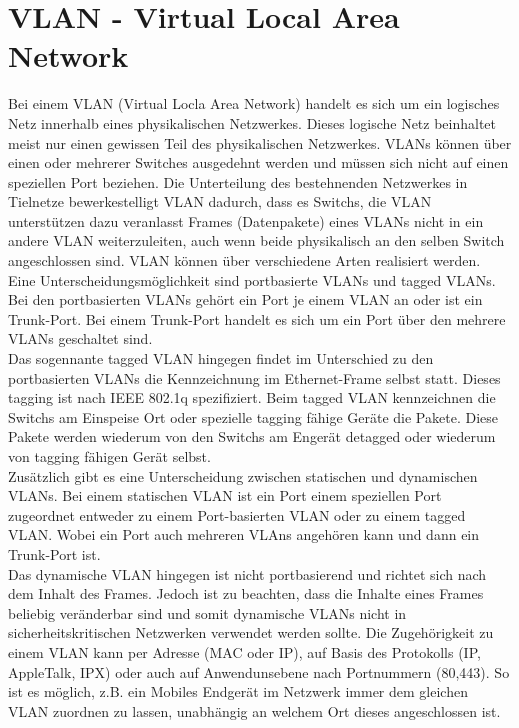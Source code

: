 \section{VLAN - Virtual Local Area Network}
\label{sec:vlan}

Bei einem VLAN (Virtual Locla Area Network) handelt es sich um ein logisches Netz innerhalb eines physikalischen Netzwerkes. Dieses logische Netz beinhaltet meist nur einen gewissen Teil des physikalischen Netzwerkes. VLANs können über einen oder mehrerer Switches ausgedehnt werden und müssen sich nicht auf einen speziellen Port beziehen. Die Unterteilung des bestehnenden Netzwerkes in Tielnetze bewerkestelligt VLAN dadurch, dass es Switchs, die VLAN unterstützen dazu veranlasst Frames (Datenpakete) eines VLANs nicht in ein andere VLAN weiterzuleiten, auch wenn beide physikalisch an den selben Switch angeschlossen sind.
VLAN können über verschiedene Arten realisiert werden. Eine Unterscheidungsmöglichkeit sind portbasierte VLANs und tagged VLANs.
Bei den portbasierten VLANs gehört ein Port je einem VLAN an oder ist ein Trunk-Port. Bei einem Trunk-Port handelt es sich um ein Port über den mehrere VLANs geschaltet sind.\\
Das sogennante tagged VLAN hingegen findet im Unterschied zu den portbasierten VLANs die Kennzeichnung im Ethernet-Frame selbst statt. Dieses tagging ist nach IEEE 802.1q spezifiziert.
Beim tagged VLAN kennzeichnen die Switchs am Einspeise Ort oder spezielle tagging fähige Geräte die Pakete. Diese Pakete werden wiederum von den Switchs am Engerät detagged oder wiederum von tagging fähigen Gerät selbst.\\
Zusätzlich gibt es eine Unterscheidung zwischen statischen und dynamischen VLANs.
Bei einem statischen VLAN ist ein Port einem speziellen Port zugeordnet entweder zu einem Port-basierten VLAN oder zu einem tagged VLAN. Wobei ein Port auch mehreren VLAns angehören kann und dann ein Trunk-Port ist.\\
Das dynamische VLAN hingegen ist nicht portbasierend und richtet sich nach dem Inhalt des Frames. Jedoch ist zu beachten, dass die Inhalte eines Frames beliebig veränderbar sind und somit dynamische VLANs nicht in sicherheitskritischen Netzwerken verwendet werden sollte.
Die Zugehörigkeit zu einem VLAN kann per Adresse (MAC oder IP), auf Basis des Protokolls (IP, AppleTalk, IPX) oder auch auf Anwendunsebene nach Portnummern (80,443). So ist es möglich, z.B. ein Mobiles Endgerät im Netzwerk immer dem gleichen VLAN zuordnen zu lassen, unabhängig an welchem Ort dieses angeschlossen ist.\\
